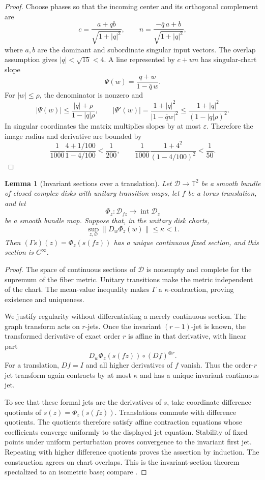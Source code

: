 \documentclass[10pt,a4paper]{amsart}
\numberwithin{equation}{section}
\newtheorem{lemma}[theorem]{Lemma}
\newcommand{\T}{\mathbb T}
\newcommand{\norm}[1]{\lVert #1\rVert}
\begin{document}
\begin{proof}
Choose phases so that the incoming center and its orthogonal complement are
\[
 c=\frac{a+qb}{\sqrt{1+|q|^2}},\qquad
 n=\frac{-\overline q\,a+b}{\sqrt{1+|q|^2}},
\]
where $a,b$ are the dominant and subordinate singular input vectors.  The
overlap assumption gives $|q|<\sqrt{15}<4$.  A line represented by $c+wn$
has singular-chart slope
\[
 \Psi(w)=\frac{q+w}{1-\overline q\,w}.
\]
For $|w|\le\rho$, the denominator is nonzero and
\[
 |\Psi(w)|\le\frac{|q|+\rho}{1-|q|\rho},\qquad
 |\Psi'(w)|=\frac{1+|q|^2}{|1-\overline q w|^2}
 \le\frac{1+|q|^2}{(1-|q|\rho)^2}.
\]
In singular coordinates the matrix multiplies slopes by at most
$\varepsilon$.  Therefore the image radius and derivative are bounded by
\[
 \frac1{1000}\frac{4+1/100}{1-4/100}<\frac1{200},\qquad
 \frac1{1000}\frac{1+4^2}{(1-4/100)^2}<\frac1{50}.
\]
\end{proof}

\begin{lemma}[Invariant sections over a translation]\label{lem:section-theorem}
Let $\mathcal D\to\T^2$ be a smooth bundle of closed complex disks with
unitary transition maps, let $f$ be a torus translation, and let
\[
 \Phi_z:\mathcal D_{fz}\longrightarrow\operatorname{int}\mathcal D_z
\]
be a smooth bundle map.  Suppose that, in the unitary disk charts,
\[
 \sup_{z,w}\norm{D_w\Phi_z(w)}\le\kappa<1.
\]
Then $(\Gamma s)(z)=\Phi_z(s(fz))$ has a unique continuous fixed section,
and this section is $C^\infty$.
\end{lemma}

\begin{proof}
The space of continuous sections of $\mathcal D$ is nonempty and complete for
the supremum of the fiber metric.  Unitary transitions make the metric
independent of the chart.  The mean-value inequality makes $\Gamma$ a
$\kappa$-contraction, proving existence and uniqueness.

We justify regularity without differentiating a merely continuous section.
The graph transform acts on $r$-jets.  Once the invariant $(r-1)$-jet is
known, the transformed derivative of exact order $r$ is affine in that
derivative, with linear part
\[
 D_w\Phi_z(s(fz))\circ(Df)^{\otimes r}.
\]
For a translation, $Df=I$ and all higher derivatives of $f$ vanish.  Thus
the order-$r$ jet transform again contracts by at most $\kappa$ and has a
unique invariant continuous jet.

To see that these formal jets are the derivatives of $s$, take coordinate
difference quotients of $s(z)=\Phi_z(s(fz))$.  Translations commute with
difference quotients.  The quotients therefore satisfy affine contraction
equations whose coefficients converge uniformly to the displayed jet
equation.  Stability of fixed points under uniform perturbation proves
convergence to the invariant first jet.  Repeating with higher difference
quotients proves the assertion by induction.  The construction agrees on
chart overlaps.  This is the invariant-section theorem specialized to an
isometric base; compare \cite[Chapter~3]{HPS}.
\end{proof}
\end{document}
